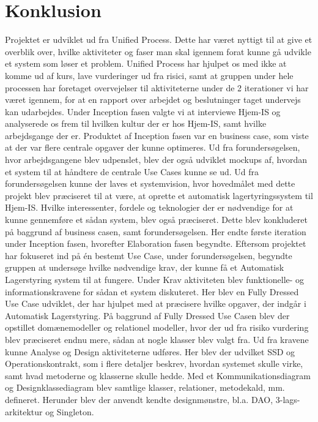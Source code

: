 \chapter{Konklusion}\label{ch:konklusion}

Projektet er udviklet ud fra Unified Process\cite{UnifiedProcess}. Dette har været nyttigt til at give et overblik over, hvilke aktiviteter og faser man skal igennem forat kunne gå udvikle et system som løser et problem. Unified Process har hjulpet os med ikke at komme ud af kurs, lave vurderinger ud fra risici, samt at gruppen under hele processen har foretaget overvejelser til aktiviteterne under de 2 iterationer vi har været igennem, for at en rapport over arbejdet og beslutninger taget undervejs kan udarbejdes. 
Under Inception fasen valgte vi at interviewe Hjem-IS og analyserede os frem til hvilken kultur der er hos Hjem-IS, samt hvilke arbejdsgange der er. Produktet af Inception fasen var en business case, som viste at der var flere centrale opgaver der kunne optimeres. Ud fra forundersøgelsen, hvor arbejdsgangene blev udpenslet, blev der også udviklet mockups af, hvordan et system til at håndtere de centrale Use Cases kunne se ud.
Ud fra forundersøgelsen kunne der laves et systemvision, hvor hovedmålet med dette projekt blev præciseret til at være, at oprette et automatisk lagertyringssystem til Hjem-IS. Hvilke interessenter, fordele og teknologier der er nødvendige for at kunne gennemføre et sådan system, blev også præciseret. Dette blev konkluderet på baggrund af business casen, samt forundersøgelsen. 
Her endte første iteration under Inception fasen, hvorefter Elaboration fasen begyndte. Eftersom projektet har fokuseret ind på én bestemt Use Case, under forundersøgelsen, begyndte gruppen at undersøge hvilke nødvendige krav, der kunne få et Automatisk Lagerstyring system til at fungere. 
Under Krav aktiviteten blev funktionelle- og informationskravene for sådan et system diskuteret. Her blev en Fully Dressed Use Case udviklet, der har hjulpet med at præcisere hvilke opgaver, der indgår i Automatisk Lagerstyring. På baggrund af Fully Dressed Use Casen blev der opstillet domænemodeller og relationel modeller, hvor der ud fra risiko vurdering blev præciseret endnu mere, sådan at nogle klasser blev valgt fra.
Ud fra kravene kunne Analyse og Design aktiviteterne udføres. Her blev der udvilket SSD og Operationskontrakt, som i flere detaljer beskrev, hvordan systemet skulle virke, samt hvad metoderne og klasserne skulle hedde. Med et Kommunikationsdiagram og Designklassediagram blev samtlige klasser, relationer, metodekald, mm. defineret. Herunder blev der anvendt kendte designmønstre, bl.a. DAO, 3-lags-arkitektur og Singleton. 
